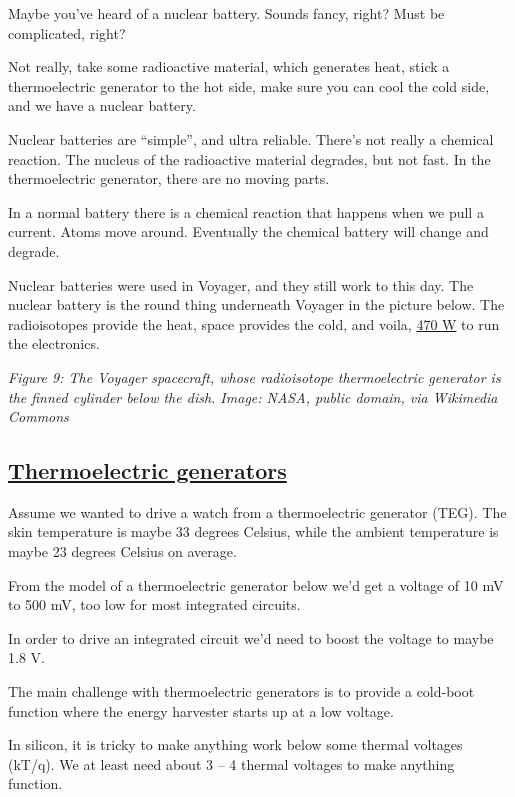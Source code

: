 Maybe you've heard of a nuclear battery. Sounds fancy, right? Must be
complicated, right?

Not really, take some radioactive material, which generates heat, stick
a thermoelectric generator to the hot side, make sure you can cool the
cold side, and we have a nuclear battery.

Nuclear batteries are ``simple'', and ultra reliable. There's not really
a chemical reaction. The nucleus of the radioactive material degrades,
but not fast. In the thermoelectric generator, there are no moving
parts.

In a normal battery there is a chemical reaction that happens when we
pull a current. Atoms move around. Eventually the chemical battery will
change and degrade.

Nuclear batteries were used in Voyager, and they still work to this day.
The nuclear battery is the round thing underneath Voyager in the picture
below. The radioisotopes provide the heat, space provides the cold, and
voila, \href{https://en.wikipedia.org/wiki/Voyager_1}{470 W} to run the
electronics.


{
\centering
{}
}

\emph{Figure 9: The Voyager spacecraft, whose radioisotope
thermoelectric generator is the finned cylinder below the dish. Image:
NASA, public domain, via Wikimedia Commons}

\subsection{\texorpdfstring{\href{https://en.wikipedia.org/wiki/Thermoelectric_generator}{Thermoelectric
generators}}{Thermoelectric generators}}\label{thermoelectric-generators}

Assume we wanted to drive a watch from a thermoelectric generator (TEG).
The skin temperature is maybe 33 degrees Celsius, while the ambient
temperature is maybe 23 degrees Celsius on average.

From the model of a thermoelectric generator below we'd get a voltage of
10 mV to 500 mV, too low for most integrated circuits.

In order to drive an integrated circuit we'd need to boost the voltage
to maybe 1.8 V.

The main challenge with thermoelectric generators is to provide a
cold-boot function where the energy harvester starts up at a low
voltage.

In silicon, it is tricky to make anything work below some thermal
voltages (kT/q). We at least need about 3 -- 4 thermal voltages to make
anything function.

